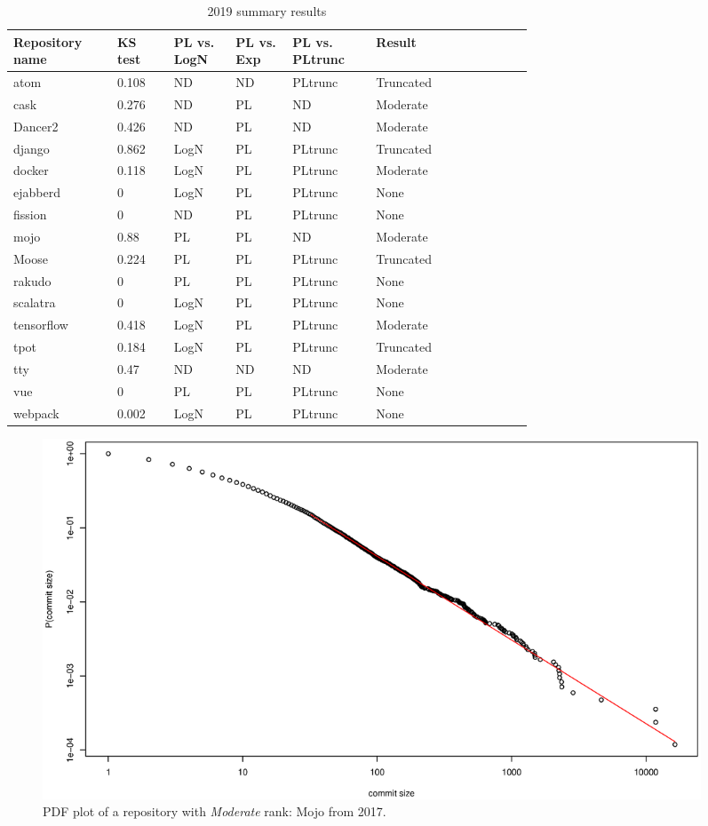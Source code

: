 \documentclass[conference]{IEEEtran}
\begin{document}
\begin{table}[htbp]
	\caption{2019 summary results}
	\begin{center}
		\begin{tabular}{| p{0.12\linewidth} | p{0.08\linewidth} | p{0.08\linewidth} | p{0.08\linewidth} | p{0.1\linewidth} |p{0.13\linewidth} | p{0.09\linewidth} |}
			\hline
			Repository name & KS test & PL vs. LogN & PL vs. Exp & PL vs. PLtrunc & Result \\ 
			\hline
			atom &0.108 &ND &ND &PLtrunc & Truncated \\
			cask &0.276 &ND &PL &ND & Moderate \\
			Dancer2 &0.426 &ND &PL &ND & Moderate \\
			django &0.862 &LogN &PL &PLtrunc &Truncated \\
			docker &0.118 &LogN &PL &PLtrunc & Moderate \\
			ejabberd &0 &LogN &PL &PLtrunc & None\\
			fission &0 &ND &PL &PLtrunc & None \\
			mojo &0.88 &PL &PL &ND &Moderate \\
			Moose &0.224 &PL &PL &PLtrunc &Truncated \\
			rakudo &0 &PL &PL &PLtrunc & None \\
			scalatra &0 &LogN &PL &PLtrunc & None \\
			tensorflow &0.418 &LogN &PL &PLtrunc & Moderate \\
			tpot &0.184 &LogN &PL &PLtrunc & Truncated \\
			tty &0.47 &ND &ND &ND & Moderate \\
			vue &0 &PL &PL &PLtrunc & None \\
			webpack &0.002 &LogN &PL &PLtrunc & None\\
			\hline
		\end{tabular}
	\end{center}
\label{tab:2019tests}
\end{table}

\begin{figure}[htbp]
	\centerline{\includegraphics[width=0.95\textwidth]{plots/mojo-2017.eps}}
	\caption{PDF plot of a repository with \textit{Moderate} rank: Mojo from 2017.}
	\label{fig:mojo}
\end{figure}
\end{document}

